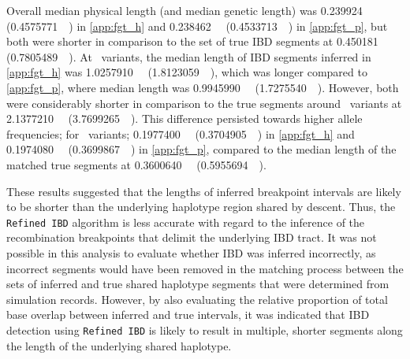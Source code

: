 Overall median physical length (and median genetic length) was
\SI{0.239924}{\mega\basepair} (\SI{0.4575771}{\centi\morgan}) in \ref{app:fgt_h} and
\SI{0.238462}{\mega\basepair} (\SI{0.4533713}{\centi\morgan}) in \ref{app:fgt_p},
but both were shorter in comparison to the set of true IBD segments at
\SI{0.450181}{\mega\basepair} (\SI{0.7805489}{\centi\morgan}).
At ~variants, the median length of IBD segments inferred in \ref{app:fgt_h} was
\SI{1.0257910}{\mega\basepair} (\SI{1.8123059}{\centi\morgan}),
which was longer compared to \ref{app:fgt_p}, where median length was
\SI{0.9945990}{\mega\basepair} (\SI{1.7275540}{\centi\morgan}).
However, both were considerably shorter in comparison to the true segments around ~variants at
\SI{2.1377210}{\mega\basepair} (\SI{3.7699265}{\centi\morgan}).
This difference persisted towards higher allele frequencies; \eg for ~variants;
\SI{0.1977400}{\mega\basepair} (\SI{0.3704905}{\centi\morgan}) in \ref{app:fgt_h} and
\SI{0.1974080}{\mega\basepair} (\SI{0.3699867}{\centi\morgan}) in \ref{app:fgt_p}, compared to the median length of the matched true segments at
\SI{0.3600640}{\mega\basepair} (\SI{0.5955694}{\centi\morgan}).


These results suggested that the lengths of inferred breakpoint intervals are likely to be shorter than the underlying haplotype region shared by descent.
Thus, the \texttt{Refined\,IBD} algorithm is less accurate with regard to the inference of the recombination breakpoints that delimit the underlying IBD tract.
It was not possible in this analysis to evaluate whether IBD was inferred incorrectly, as incorrect segments would have been removed in the matching process between the sets of inferred and true shared haplotype segments that were determined from simulation records.
However, by also evaluating the relative proportion of total base overlap between inferred and true intervals, it was indicated that IBD detection using \texttt{Refined\,IBD} is likely to result in multiple, shorter segments along the length of the underlying shared haplotype.


